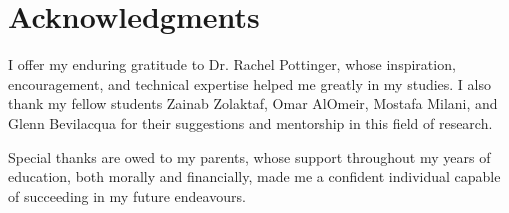 
\chapter{Acknowledgments}

I offer my enduring gratitude to Dr. Rachel Pottinger, whose inspiration, encouragement, and technical expertise helped me greatly in my studies. I also thank my fellow students Zainab Zolaktaf, Omar AlOmeir, Mostafa Milani, and Glenn Bevilacqua for their suggestions and mentorship in this field of research.

Special thanks are owed to my parents, whose support throughout my years of education, both morally and financially, made me a confident individual capable of succeeding in my future endeavours.
